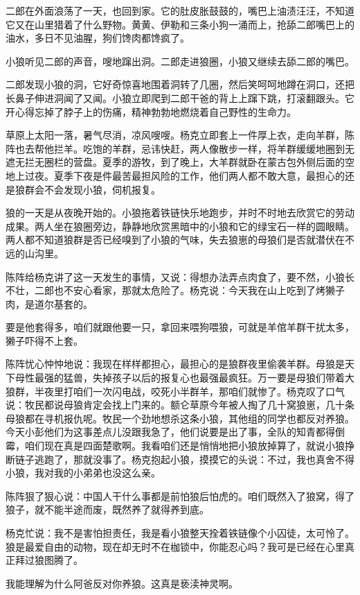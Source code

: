 \par 二郎在外面浪荡了一天，也回到家。它的肚皮胀鼓鼓的，嘴巴上油渍汪汪，不知道它又在山里猎着了什么野物。黄黄、伊勒和三条小狗一涌而上，抢舔二郎嘴巴上的油水，多日不见油腥，狗们馋肉都馋疯了。
\par 小狼听见二郎的声音，嗖地蹿出洞。二郎走进狼圈，小狼又继续去舔二郎的嘴巴。
\par 二郎发现小狼的洞，它好奇惊喜地围着洞转了几圈，然后笑呵呵地蹲在洞口，还把长鼻子伸进洞闻了又闻。小狼立即爬到二郎干爸的背上上蹿下跳，打滚翻跟头。它开心得忘掉了脖子上的伤痛，精神勃勃地燃烧着自己野性的生命力。
\par 草原上太阳一落，暑气尽消，凉风嗖嗖。杨克立即套上一件厚上衣，走向羊群，陈阵也去帮他拦羊。吃饱的羊群，忌讳快赶，两人像散步一样，将羊群缓缓地圈到无遮无拦无圈栏的营盘。夏季的游牧，到了晚上，大羊群就卧在蒙古包外侧后面的空地上过夜。夏季下夜是件最苦最担风险的工作，他们两人都不敢大意，最担心的还是狼群会不会发现小狼，伺机报复。
\par 狼的一天是从夜晚开始的。小狼拖着铁链快乐地跑步，并时不时地去欣赏它的劳动成果。两人坐在狼圈旁边，静静地欣赏黑暗中的小狼和它的绿宝石一样的圆眼睛。两人都不知道狼群是否已经嗅到了小狼的气味，失去狼崽的母狼们是否就潜伏在不远的山沟里。
\par 陈阵给杨克讲了这一天发生的事情，又说：得想办法弄点肉食了，要不然，小狼长不壮，二郎也不安心看家，那就太危险了。杨克说：今天我在山上吃到了烤獭子肉，是道尔基套的。
\par 要是他套得多，咱们就跟他要一只，拿回来喂狗喂狼，可就是羊倌羊群干扰太多，獭子吓得不上套。
\par 陈阵忧心忡忡地说：我现在样样都担心，最担心的是狼群夜里偷袭羊群。母狼是天下母性最强的猛兽，失掉孩子以后的报复心也最强最疯狂。万一要是母狼们带着大狼群，半夜里打咱们一次闪电战，咬死小半群羊，那咱们就惨了。杨克叹了口气说：牧民都说母狼肯定会找上门来的。额仑草原今年被人掏了几十窝狼崽，几十条母狼都在寻机报仇呢。牧民一个劲地想杀这条小狼，其他组的同学也都反对养狼。今天小彭他们为这事差点儿没跟我急了，他们说要是出了事，全队的知青都得倒霉，咱们现在真是四面楚歌啊。我看咱们还是悄悄地把小狼放掉算了，就说小狼挣断链子逃跑了，那就没事了。杨克抱起小狼，摸摸它的头说：不过，我也真舍不得小狼，我对我的小弟弟也没这么亲。
\par 陈阵狠了狠心说：中国人干什么事都是前怕狼后怕虎的。咱们既然入了狼窝，得了狼子，就不能半途而废，既然养了就得养到底。
\par 杨克忙说：我不是害怕担责任，我是看小狼整天拴着铁链像个小囚徒，太可怜了。狼是最爱自由的动物，现在却无时不在枷锁中，你能忍心吗？我可是已经在心里真正拜过狼图腾了。
\par 我能理解为什么阿爸反对你养狼。这真是亵渎神灵啊。
